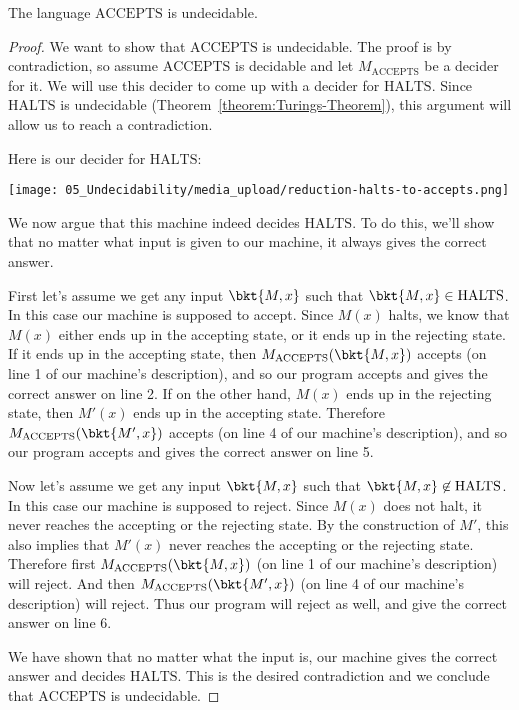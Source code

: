 \begin{flex}
\begin{theorem} \label{theorem:mathrmACCEPTS-is-undecidable}
The language $\mathrm{ACCEPTS}$ is undecidable.
\end{theorem}

\begin{proof}
We want to show that $\text{ACCEPTS}$ is undecidable. The proof is by contradiction, so assume $\text{ACCEPTS}$ is decidable and let $M_\text{ACCEPTS}$ be a decider for it. We will use this decider to come up with a decider for $\text{HALTS}$. Since $\text{HALTS}$ is undecidable (Theorem~\ref{theorem:Turings-Theorem}), this argument will allow us to reach a contradiction.

Here is our decider for $\text{HALTS}$:

\begin{center}
\texttt{[image: 05\_Undecidability/media\_upload/reduction-halts-to-accepts.png]}
\end{center}

We now argue that this machine indeed decides $\text{HALTS}$. To do this, we'll show that no matter what input is given to our machine, it always gives the correct answer. 

First let's assume we get any input $\bkt{M,x}$ such that $\bkt{M,x} \in \text{HALTS}$. In this case our machine is supposed to accept. Since $M(x)$ halts, we know that $M(x)$ either ends up in the accepting state, or it ends up in the rejecting state. If it ends up in the accepting state, then $M_\text{ACCEPTS}(\bkt{M,x})$ accepts (on line 1 of our machine's description), and so our program accepts and gives the correct answer on line 2. If on the other hand, $M(x)$ ends up in the rejecting state, then $M'(x)$ ends up in the accepting state. Therefore $M_\text{ACCEPTS}(\bkt{M',x})$ accepts (on line 4 of our machine's description), and so our program accepts and gives the correct answer on line 5. 

Now let's assume we get any input $\bkt{M,x}$ such that $\bkt{M,x} \not \in \text{HALTS}$. In this case our machine is supposed to reject. Since $M(x)$ does not halt, it never reaches the accepting  or the rejecting state. By the construction of $M'$, this also implies that $M'(x)$ never reaches the accepting or the rejecting state. Therefore first $M_\text{ACCEPTS}(\bkt{M,x})$ (on line 1 of our machine's description) will reject. And then $M_\text{ACCEPTS}(\bkt{M',x})$ (on line 4 of our machine's description) will reject. Thus our program will reject as well, and give the correct answer on line 6.

We have shown that no matter what the input is, our machine gives the correct answer and decides $\text{HALTS}$. This is the desired contradiction and we conclude that $\text{ACCEPTS}$ is undecidable.
\end{proof}
\end{flex}


